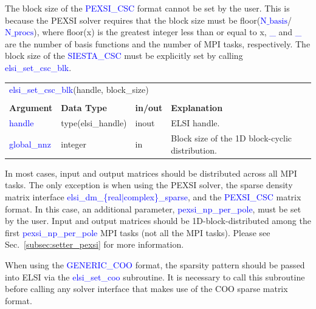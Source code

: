 \documentclass{report}
\newcommand{\tcb}[1]{\textcolor{blue}{#1}}
\begin{document}
The block size of the \tcb{PEXSI\_CSC} format cannot be set by the user. This is because the PEXSI solver requires that the block size must be floor(\tcb{$\text{N}\_\text{basis}$}/\tcb{$\text{N}\_\text{procs}$}), where floor(x) is the greatest integer less than or equal to x, \tcb{\_} and \tcb{\_} are the number of basis functions and the number of MPI tasks, respectively. The block size of the \tcb{SIESTA\_CSC} must be explicitly set by calling \tcb{elsi\_set\_csc\_blk}.

\begin{tabular}[]{|p{30mm}|p{30mm}|p{15mm}|p{90mm}|}
\multicolumn{4}{l}{\tcb{elsi\_set\_csc\_blk}(handle, block\_size)}\\
\multicolumn{4}{l}{}\\
\hline
\multicolumn{1}{|l|}{\textbf{Argument}} & \multicolumn{1}{l|}{\textbf{Data Type}} & \multicolumn{1}{l|}{\textbf{in/out}} & \multicolumn{1}{l|}{\textbf{Explanation}}\\
\hline
\tcb{handle}      & type(elsi\_handle) & inout & ELSI handle.\\
\hline
\tcb{global\_nnz} & integer            & in    & Block size of the 1D block-cyclic distribution.\\
\hline
\end{tabular}

In most cases, input and output matrices should be distributed across all MPI tasks. The only exception is when using the PEXSI solver, the sparse density matrix interface \tcb{elsi\_dm\_\{real$\vert$complex\}\_sparse}, and the \tcb{PEXSI\_CSC} matrix format. In this case, an additional parameter, \tcb{pexsi\_np\_per\_pole}, must be set by the user. Input and output matrices should be 1D-block-distributed among the first \tcb{pexsi\_np\_per\_pole} MPI tasks (not all the MPI tasks). Please see Sec.~\ref{subsec:setter_pexsi} for more information.

When using the \tcb{GENERIC\_COO} format, the sparsity pattern should be passed into ELSI via the \tcb{elsi\_set\_coo} subroutine. It is necessary to call this subroutine before calling any solver interface that makes use of the COO sparse matrix format.
\end{document}
